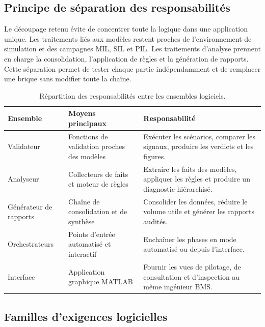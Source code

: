 \subsection{Principe de séparation des responsabilités}
\label{subsec:ch5_separation}

Le découpage retenu évite de concentrer toute la logique dans une application unique. Les traitements liés aux modèles restent proches de l'environnement de simulation et des campagnes MIL, SIL et PIL. Les traitements d'analyse prennent en charge la consolidation, l'application de règles et la génération de rapports. Cette séparation permet de tester chaque partie indépendamment et de remplacer une brique sans modifier toute la chaîne.

\begin{table}[H]
  \centering
  \small
  \begin{tabularx}{\textwidth}{|l|X|X|}
    \hline
    \textbf{Ensemble} & \textbf{Moyens principaux} & \textbf{Responsabilité} \\
    \hline
    Validateur & Fonctions de validation proches des modèles & Exécuter les scénarios, comparer les signaux, produire les verdicts et les figures. \\
    \hline
    Analyseur & Collecteurs de faits et moteur de règles & Extraire les faits des modèles, appliquer les règles et produire un diagnostic hiérarchisé. \\
    \hline
    Générateur de rapports & Chaîne de consolidation et de synthèse & Consolider les données, réduire le volume utile et générer les rapports audités. \\
    \hline
    Orchestrateurs & Points d'entrée automatisé et interactif & Enchaîner les phases en mode automatisé ou depuis l'interface. \\
    \hline
    Interface & Application graphique MATLAB & Fournir les vues de pilotage, de consultation et d'inspection au même ingénieur BMS. \\
    \hline
  \end{tabularx}
  \captionsetup{width=0.9\textwidth, skip=15pt}
  \caption{Répartition des responsabilités entre les ensembles logiciels.}
  \label{tab:ch5_responsabilites}
\end{table}

\subsection{Familles d'exigences logicielles}
\label{subsec:ch5_exigences_logicielles}

